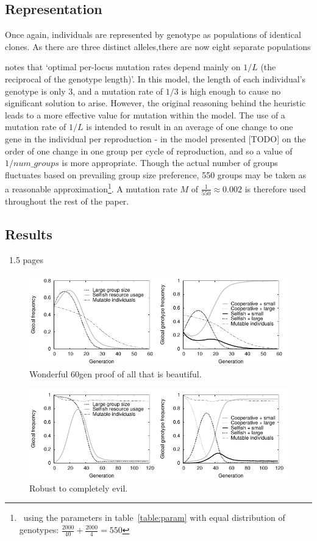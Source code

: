 \documentclass[11pt]{article}
\begin{document}
\subsection{Representation}
Once again, individuals are represented by genotype as populations of identical clones. As there are three distinct alleles,there are now eight separate populations

\citet{optimal} notes that `optimal per-locus mutation rates depend mainly on $1/L$ (the reciprocal of the genotype length)'. In this model, the length of each individual's genotype is only 3, and a mutation rate of $1/3$ is high enough to cause no significant solution to arise. %
However, the original reasoning behind the heuristic leads to a more effective value for mutation within the model. The use of a mutation rate of $1/L$ is intended to result in an average of one change to one gene in the individual per reproduction - in the model presented [TODO]%
on the order of one change in one group per cycle of reproduction, and so a value of $1/num\_groups$ is more appropriate. Though the actual number of groups fluctuates based on prevailing group size preference, 550 groups may be taken as a reasonable approximation\footnote{~using the parameters in table~\ref{table:param} with equal distribution of genotypes: $\frac{2000}{40} + \frac{2000}{4} = 550$}. A mutation rate $M$ of $\frac{1}{550} \approx 0.002$ is therefore used throughout the rest of the paper.
\subsection{Results}
~1.5 pages
\begin{figure}[!ht]
  \centering
  \includegraphics{60geneqmutfix.pdf}
  \caption{Wonderful 60gen proof of all that is beautiful.}
  \label{fig:60geneqmutfix}
\end{figure}

\begin{figure}[!ht]
  \centering
  \includegraphics{120geninteresting.pdf}
  \caption{Robust to completely evil.}
  \label{fig:120geninteresting}
\end{figure}
\end{document}
